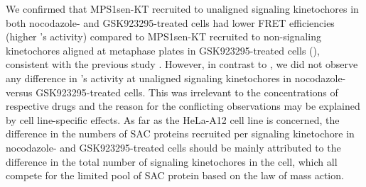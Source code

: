 We confirmed that MPS1sen-KT recruited to unaligned signaling kinetochores in both nocodazole- and GSK923295-treated cells had lower FRET efficiencies (higher 's activity) compared to MPS1sen-KT recruited to non-signaling kinetochores aligned at metaphase plates in GSK923295-treated cells (), consistent with the previous study \cite{MPS1senor}. However, in contrast to \cite{MPS1senor}, we did not observe any difference in 's activity at unaligned signaling kinetochores in nocodazole- versus GSK923295-treated cells. This was irrelevant to the concentrations of respective drugs and the reason for the conflicting observations may be explained by cell line-specific effects. As far as the HeLa-A12 cell line is concerned, the difference in the numbers of SAC proteins recruited per signaling kinetochore in nocodazole- and GSK923295-treated cells should be mainly attributed to the difference in the total number of signaling kinetochores in the cell, which all compete for the limited pool of SAC protein based on the law of mass action.



